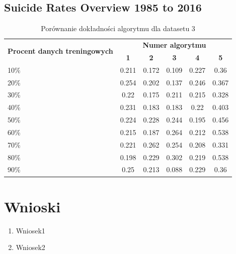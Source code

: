 \documentclass[a4paper,11pt]{article}
\begin{document}
\subsection{Suicide Rates Overview 1985 to 2016} 

\begin{table}[H]
\centering
\begin{tabular}{|l|c|c|c|c|c|}
\hline
\multicolumn{1}{|c|}{\multirow{2}{*}{\textbf{Procent danych treningowych}}} & \multicolumn{5}{c|}{\textbf{Numer algorytmu}}                       \\ \cline{2-6}
\multicolumn{1}{|c|}{}                                                      & \textbf{1} & \textbf{2} & \textbf{3} & \textbf{4} & \textbf{5} \\ \hline
10\%                                                                   & 0.211      & 0.172      & 0.109      & 0.227      & 0.36       \\ \hline
20\%                                                                   & 0.254      & 0.202      & 0.137      & 0.246      & 0.367      \\ \hline
30\%                                                                   & 0.22       & 0.175      & 0.211      & 0.215      & 0.328      \\ \hline
40\%                                                                   & 0.231      & 0.183      & 0.183      & 0.22       & 0.403      \\ \hline
50\%                                                                   & 0.224      & 0.228      & 0.244      & 0.195      & 0.456      \\ \hline
60\%                                                                   & 0.215      & 0.187      & 0.264      & 0.212      & 0.538      \\ \hline
70\%                                                                   & 0.221      & 0.262      & 0.254      & 0.208      & 0.331      \\ \hline
80\%                                                                   & 0.198      & 0.229      & 0.302      & 0.219      & 0.538      \\ \hline
90\%                                                                   & 0.25       & 0.213      & 0.088      & 0.229      & 0.36       \\ \hline
\end{tabular}
\caption{Porównanie dokładności algorytmu dla datasetu 3}
\label{tab:dataset3}
\end{table}

\section{Wnioski}
\begin{enumerate}
    \item Wniosek1
    \item Wniosek2
\end{enumerate}
\end{document}
